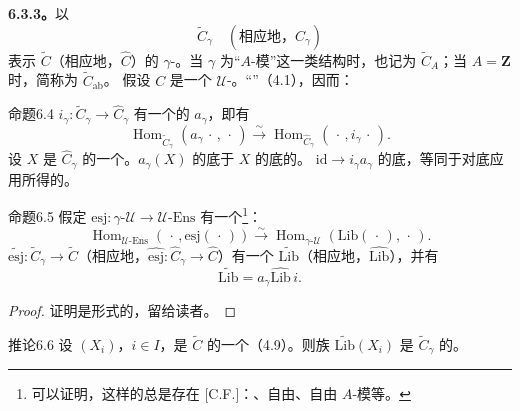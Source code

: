 \textbf{6.3.3。}以
\[\widetilde C_\gamma\quad(\text{相应地，}\widehat C_\gamma)\]
表示 $\widetilde C$（相应地，$\widehat C$）的 $\gamma$-。当 $\gamma$ 为“$A$-模”这一类结构时，也记为 $\widetilde C_A$；当 $A=\mathbf Z$ 时，简称为 $\widetilde C_{\mathrm{ab}}$。
假设 $C$ 是一个 $\mathcal U$-。“”（4.1），因而：
\begin{SGAresult}{命题}{6.4}
 $i_\gamma:\widetilde C_\gamma\to\widehat C_\gamma$ 有一个的 $a_\gamma$，即有
\[\operatorname{Hom}_{\widetilde C_\gamma}(a_\gamma\,\cdot\,,\,\cdot\,)
\xrightarrow{\sim}\operatorname{Hom}_{\widehat C_\gamma}(\,\cdot\,,i_\gamma\,\cdot\,).\]
设 $X$ 是 $\widehat C_\gamma$ 的一个。$a_\gamma(X)$ 的底于 $X$ 的底的。 $\mathrm{id}\to i_\gamma a_\gamma$ 的底，等同于对底应用所得的。
\end{SGAresult}
\begin{SGAresult}{命题}{6.5}
假定 $\mathrm{esj}:\gamma\text{-}\mathcal U\to\mathcal U\text{-}\mathrm{Ens}$ 有一个\footnote{可以证明，这样的总是存在 [C.F.]：、自由、自由 $A$-模等。}：
\[\operatorname{Hom}_{\mathcal U\text{-}\mathrm{Ens}}(\,\cdot\,,\mathrm{esj}(\,\cdot\,))
\xrightarrow{\sim}\operatorname{Hom}_{\gamma\text{-}\mathcal U}(\mathrm{Lib}(\,\cdot\,),\,\cdot\,).\]
 $\widetilde{\mathrm{esj}}:\widetilde C_\gamma\to\widetilde C$（相应地，$\widehat{\mathrm{esj}}:\widehat C_\gamma\to\widehat C$）有一个 $\widetilde{\mathrm{Lib}}$（相应地，$\widehat{\mathrm{Lib}}$），并有
\[\widetilde{\mathrm{Lib}}=a_\gamma\widehat{\mathrm{Lib}}\,i.\]
\end{SGAresult}
\begin{proof}证明是形式的，留给读者。\end{proof}
\begin{SGAresult}{推论}{6.6}
设 $(X_i)$，$i\in I$，是 $\widetilde C$ 的一个（4.9）。则族 $\widetilde{\mathrm{Lib}}(X_i)$ 是 $\widetilde C_\gamma$ 的。
\end{SGAresult}
